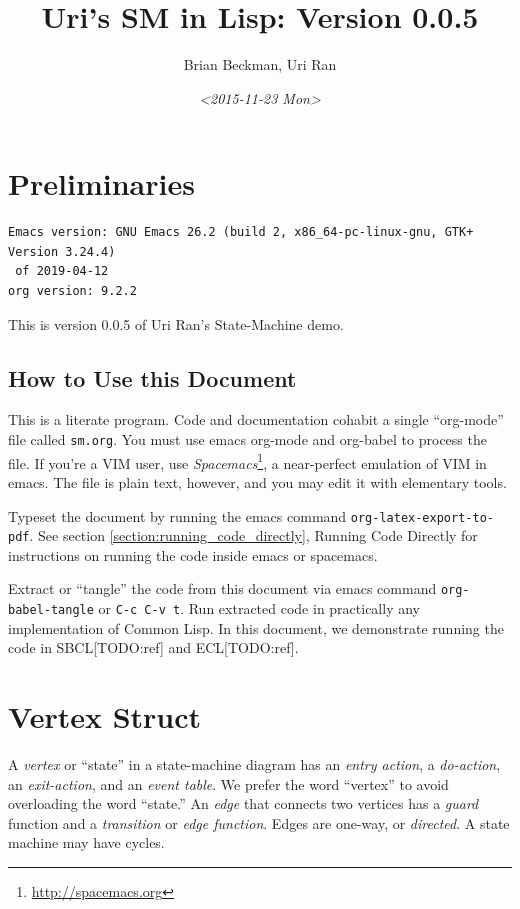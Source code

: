 \documentclass[10pt,oneside,x11names]{article}
\author{Brian Beckman, Uri Ran}
\date{\textit{<2015-11-23 Mon>}}
\title{Uri's SM in Lisp: Version 0.0.5}
\begin{document}
\maketitle
\setcounter{tocdepth}{2}
\tableofcontents


\section{Preliminaries}
\label{sec:orgdddc82c}

\begin{verbatim}
Emacs version: GNU Emacs 26.2 (build 2, x86_64-pc-linux-gnu, GTK+ Version 3.24.4)
 of 2019-04-12
org version: 9.2.2
\end{verbatim}


This is version 0.0.5 of Uri Ran's State-Machine demo.

\subsection{How to Use this Document}
\label{sec:org9b717c9}

This is a literate program. Code and documentation cohabit a single
``org-mode'' file called \texttt{sm.org}. You must use emacs org-mode and org-babel to
process the file. If you're a VIM user, use \emph{Spacemacs}\footnote{\url{http://spacemacs.org}}, a
near-perfect emulation of VIM in emacs. The file is plain text, however, and
you may edit it with elementary tools.

Typeset the document by running the emacs command \texttt{org-latex-export-to-pdf}.
See section \ref{section:running_code_directly}, Running Code Directly for
instructions on running the code inside emacs or spacemacs.

Extract or ``tangle'' the code from this document via emacs command
\texttt{org-babel-tangle} or \texttt{C-c C-v t}. Run extracted code in practically any
implementation of Common Lisp. In this document, we demonstrate running the
code in SBCL[TODO:ref] and ECL[TODO:ref].

\section{Vertex Struct}
\label{sec:org5db4a5a}

A \emph{vertex} or ``state'' in a state-machine diagram has an \emph{entry action}, a
\emph{do-action}, an \emph{exit-action}, and an \emph{event table}. We prefer the word
``vertex'' to avoid overloading the word ``state.'' An \emph{edge} that connects two
vertices has a \emph{guard} function and a \emph{transition} or \emph{edge function}. Edges
are one-way, or \emph{directed}. A state machine may have cycles.
\end{document}

